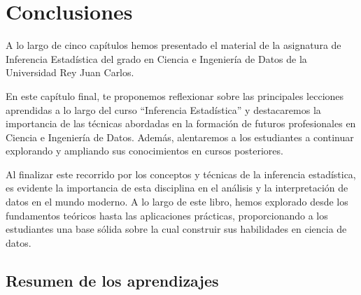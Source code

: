 \documentclass[
  letterpaper,
  DIV=11,
  numbers=noendperiod]{scrreprt}
\begin{document}

\hypertarget{sec-conclusiones}{%
\chapter{Conclusiones}\label{sec-conclusiones}}

A lo largo de cinco capítulos hemos presentado el material de la
asignatura de Inferencia Estadística del grado en Ciencia e Ingeniería
de Datos de la Universidad Rey Juan Carlos.

En este capítulo final, te proponemos reflexionar sobre las principales
lecciones aprendidas a lo largo del curso ``Inferencia Estadística'' y
destacaremos la importancia de las técnicas abordadas en la formación de
futuros profesionales en Ciencia e Ingeniería de Datos. Además,
alentaremos a los estudiantes a continuar explorando y ampliando sus
conocimientos en cursos posteriores.

Al finalizar este recorrido por los conceptos y técnicas de la
inferencia estadística, es evidente la importancia de esta disciplina en
el análisis y la interpretación de datos en el mundo moderno. A lo largo
de este libro, hemos explorado desde los fundamentos teóricos hasta las
aplicaciones prácticas, proporcionando a los estudiantes una base sólida
sobre la cual construir sus habilidades en ciencia de datos.

\hypertarget{resumen-de-los-aprendizajes}{%
\section{Resumen de los
aprendizajes}\label{resumen-de-los-aprendizajes}}
\end{document}
